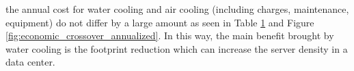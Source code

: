                 \begin{figure}[h!tb]
                    \centering
                    \label{tab:life_cycle_costs_water_cooled_air_cooled}
                \end{figure}
                the annual cost for water cooling and air cooling (including charges, maintenance, equipment) do not differ by a large amount as seen in  Table \ref{tab:life_cycle_costs_water_cooled_air_cooled} and Figure \ref{fig:economic_crossover_annualized}. In this way, the main benefit brought by water cooling is the footprint reduction which can increase the server density in a data center.

